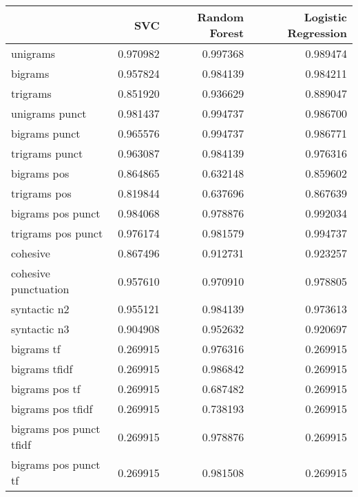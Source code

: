 \begin{tabular}{lrrr}
\toprule
{} &       SVC &  Random Forest &  Logistic Regression \\
\midrule
unigrams                   &  0.970982 &       0.997368 &             0.989474 \\
bigrams                    &  0.957824 &       0.984139 &             0.984211 \\
trigrams                   &  0.851920 &       0.936629 &             0.889047 \\
unigrams punct             &  0.981437 &       0.994737 &             0.986700 \\
bigrams punct              &  0.965576 &       0.994737 &             0.986771 \\
trigrams punct             &  0.963087 &       0.984139 &             0.976316 \\
bigrams pos                &  0.864865 &       0.632148 &             0.859602 \\
trigrams pos               &  0.819844 &       0.637696 &             0.867639 \\
bigrams pos punct          &  0.984068 &       0.978876 &             0.992034 \\
trigrams pos punct         &  0.976174 &       0.981579 &             0.994737 \\
cohesive                   &  0.867496 &       0.912731 &             0.923257 \\
cohesive punctuation       &  0.957610 &       0.970910 &             0.978805 \\
syntactic n2               &  0.955121 &       0.984139 &             0.973613 \\
syntactic n3               &  0.904908 &       0.952632 &             0.920697 \\
bigrams tf                 &  0.269915 &       0.976316 &             0.269915 \\
bigrams tfidf              &  0.269915 &       0.986842 &             0.269915 \\
bigrams pos tf             &  0.269915 &       0.687482 &             0.269915 \\
bigrams pos tfidf          &  0.269915 &       0.738193 &             0.269915 \\
bigrams pos punct tfidf    &  0.269915 &       0.978876 &             0.269915 \\
bigrams pos punct tf       &  0.269915 &       0.981508 &             0.269915 \\

\end{tabular}
